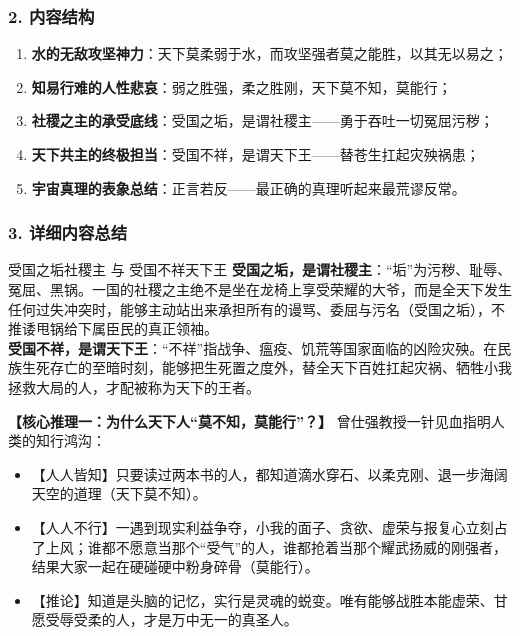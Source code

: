 \subsubsection{2. 内容结构}
\begin{enumerate}
    \item \textbf{水的无敌攻坚神力}：天下莫柔弱于水，而攻坚强者莫之能胜，以其无以易之；
    \item \textbf{知易行难的人性悲哀}：弱之胜强，柔之胜刚，天下莫不知，莫能行；
    \item \textbf{社稷之主的承受底线}：受国之垢，是谓社稷主——勇于吞吐一切冤屈污秽；
    \item \textbf{天下共主的终极担当}：受国不祥，是谓天下王——替苍生扛起灾殃祸患；
    \item \textbf{宇宙真理的表象总结}：正言若反——最正确的真理听起来最荒谬反常。
\end{enumerate}

\subsubsection{3. 详细内容总结}

\begin{ConceptBox}{受国之垢社稷主 与 受国不祥天下王}
\textbf{受国之垢，是谓社稷主}：“垢”为污秽、耻辱、冤屈、黑锅。一国的社稷之主绝不是坐在龙椅上享受荣耀的大爷，而是全天下发生任何过失冲突时，能够主动站出来承担所有的谩骂、委屈与污名（受国之垢），不推诿甩锅给下属臣民的真正领袖。\\
\textbf{受国不祥，是谓天下王}：“不祥”指战争、瘟疫、饥荒等国家面临的凶险灾殃。在民族生死存亡的至暗时刻，能够把生死置之度外，替全天下百姓扛起灾祸、牺牲小我拯救大局的人，才配被称为天下的王者。
\end{ConceptBox}

\noindent\textbf{【核心推理一：为什么天下人“莫不知，莫能行”？】}
曾仕强教授一针见血指明人类的知行鸿沟：
\begin{itemize}
    \item 【人人皆知】只要读过两本书的人，都知道滴水穿石、以柔克刚、退一步海阔天空的道理（天下莫不知）。
    \item 【人人不行】一遇到现实利益争夺，小我的面子、贪欲、虚荣与报复心立刻占了上风；谁都不愿意当那个“受气”的人，谁都抢着当那个耀武扬威的刚强者，结果大家一起在硬碰硬中粉身碎骨（莫能行）。
    \item 【推论】知道是头脑的记忆，实行是灵魂的蜕变。唯有能够战胜本能虚荣、甘愿受辱受柔的人，才是万中无一的真圣人。
\end{itemize}

